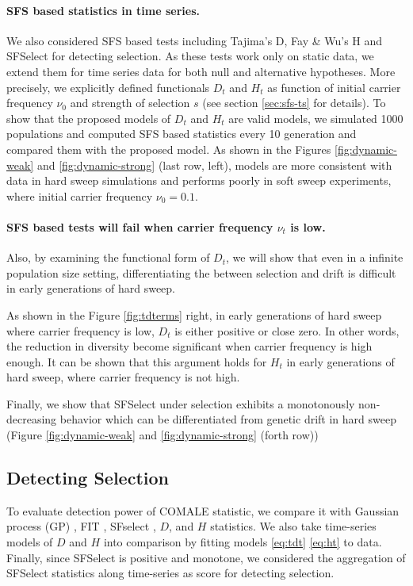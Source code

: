 \documentclass[11pt]{article}
\begin{document}
\paragraph{SFS based statistics in time series.}
We also considered SFS based tests including Tajima's D, Fay \& Wu's H and 
SFSelect for detecting selection. 
As these tests work only on static data, we extend them for time series data 
for both null and alternative hypotheses.
More precisely, we explicitly defined functionals $D_t$ and $H_t$ as function 
of initial carrier frequency $\nu_0$ and strength of selection $s$ (see section 
\ref{sec:sfs-ts} for details).
 To show that the proposed models of $D_t$ and $H_t$ are valid models, we 
 simulated 1000 populations and computed SFS based statistics every 10 
 generation and compared them with the proposed model.
 As shown in the Figures \ref{fig:dynamic-weak} and \ref{fig:dynamic-strong} 
 (last 
row, left), models are more consistent with data in hard sweep simulations and 
performs poorly in soft sweep experiments, where initial carrier frequency 
$\nu_0=0.1$.


\paragraph{SFS based tests will fail when carrier frequency $\nu_t$ is low.}
Also, by examining the functional form of $D_t$, we will show that even in a 
infinite population size setting, 
differentiating the between selection and drift is difficult in early 
generations of hard sweep. 

As shown in the Figure 
\ref{fig:tdterms} right, in early 
generations of hard sweep where carrier frequency is low, 
$D_t$ is either 
positive or close zero. In other words, the reduction in 
diversity become 
significant when carrier frequency is high enough.
It can be shown that this argument holds for $H_t$ in early generations 
of hard sweep, where carrier frequency is not high.

Finally, we show that SFSelect under selection exhibits a monotonously 
non-decreasing behavior which can be differentiated from genetic drift in hard 
sweep
(Figure \ref{fig:dynamic-weak} and \ref{fig:dynamic-strong} (forth
row))



\subsection{Detecting Selection}
To evaluate detection power of COMALE statistic, we 
compare it with Gaussian process (GP) \cite{Terhorst2015Multi}, FIT 
\cite{feder2014Identifying},  SFselect \cite{ronen2015predicting}, 
$D$\cite{tajima1989statistical}, and $H$ \cite{fay2000hitchhiking} statistics. 
We also take time-series models of $D$ and $H$ into comparison by fitting 
models \eqref{eq:tdt} \eqref{eq:ht} to data. Finally, since SFSelect is 
positive and 
monotone, we considered the aggregation of SFSelect statistics 
along time-series as score for detecting selection.
\end{document}
